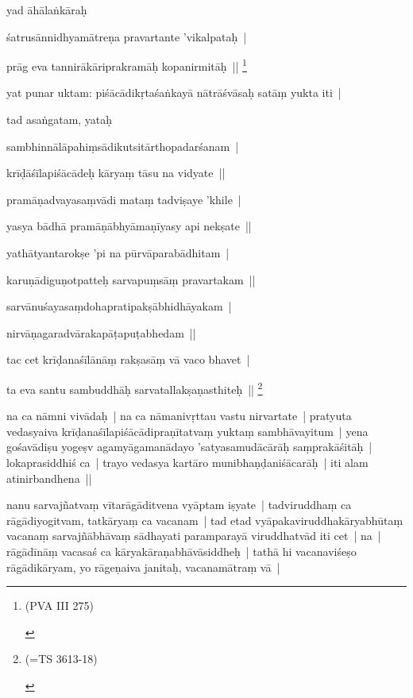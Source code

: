 \documentclass[article,12pt,a4paper]{memoir}
\begin{document}
	  \pstart yad āhālaṅkāraḥ 
	\pend
      

	  \pstart śatrusānnidhyamātreṇa pravartante 'vikalpataḥ | 
	\pend
      

	  \pstart prāg eva tannirākāriprakramāḥ kopanirmitāḥ || \footnote{\begin{english}(PVA III 275)\end{english}}
	\pend
      

	  \pstart yat punar uktam: piśācādikṛtaśaṅkayā nātrāśvāsaḥ satāṃ yukta iti | 
	\pend
      

	  \pstart tad asaṅgatam, yataḥ 
	\pend
      

	  \pstart sambhinnālāpahiṃsādikutsitārthopadarśanam | 
	\pend
      

	  \pstart krīḍāśīlapiśācādeḥ kāryaṃ tāsu na vidyate || 
	\pend
      

	  \pstart pramāṇadvayasaṃvādi mataṃ tadviṣaye 'khile | 
	\pend
      

	  \pstart yasya bādhā pramāṇābhyāmaṇīyasy api nekṣate || 
	\pend
      

	  \pstart yathātyantarokṣe 'pi na pūrvāparabādhitam | 
	\pend
      

	  \pstart karuṇādiguṇotpatteḥ sarvapuṃsāṃ pravartakam || 
	\pend
      

	  \pstart sarvānuśayasaṃdohapratipakṣābhidhāyakam | 
	\pend
      

	  \pstart nirvāṇagaradvārakapāṭapuṭabhedam || 
	\pend
      

	  \pstart tac cet krīḍanaśīlānāṃ rakṣasāṃ vā vaco bhavet | 
	\pend
      

	  \pstart ta eva santu sambuddhāḥ sarvatallakṣaṇasthiteḥ || \footnote{\begin{english}(=TS 3613-18)\end{english}}
	\pend
      

	  \pstart na ca nāmni vivādaḥ | na ca nāmanivṛttau vastu nirvartate | pratyuta vedasyaiva krīḍanaśīlapiśācādipraṇītatvaṃ yuktaṃ sambhāvayitum | yena gośavādiṣu yogeṣv agamyāgamanādayo 'satyasamudācārāḥ saṃprakāśitāḥ | lokaprasiddhiś ca | trayo vedasya kartāro munibhaṇḍaniśācarāḥ | iti alam atinirbandhena || 
	\pend
      

	  \pstart nanu sarvajñatvaṃ vītarāgāditvena vyāptam iṣyate | tadviruddhaṃ ca rāgādiyogitvam, tatkāryaṃ ca vacanam | tad etad vyāpakaviruddhakāryabhūtaṃ vacanaṃ sarvajñābhāvaṃ sādhayati paramparayā viruddhatvād iti cet | na | rāgādīnāṃ vacasaś ca kāryakāraṇabhāvāsiddheḥ | tathā hi vacanaviśeṣo rāgādikāryam, yo rāgeṇaiva janitaḥ, vacanamātraṃ vā | 
	\pend
      
\end{document}
